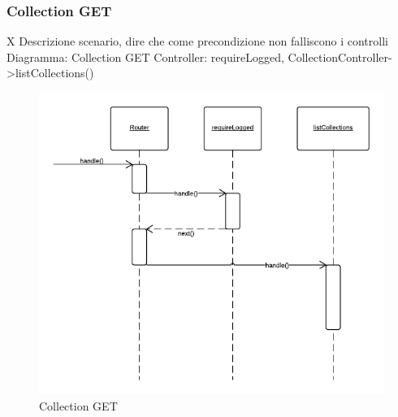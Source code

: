 \subsubsection{Collection GET} X
Descrizione scenario, dire che come precondizione non falliscono i controlli
Diagramma: Collection GET
Controller: requireLogged, CollectionController->listCollections()
\begin{figure}[H]
	\begin{center} 
		\includegraphics[scale=0.60]{scenari/Collection GET.png} 
		\caption{Collection GET}
	\end{center} 
\end{figure}

